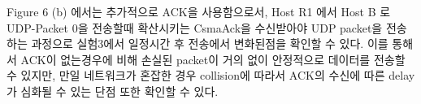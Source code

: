 Figure 6 (b) 에서는 추가적으로 ACK을 사용함으로서, Host R1 에서 Host B 로  UDP-Packet 0을 전송할때 확산시키는 CsmaAck을 수신받아야 UDP packet을 전송하는 과정으로 실험3에서 일정시간 후 전송에서 변화된점을 확인할 수 있다. 이를 통해서 ACK이 없는경우에 비해 손실된 packet이 거의 없이 안정적으로 데이터를 전송할 수 있지만, 만일 네트워크가 혼잡한 경우 collision에 따라서 ACK의 수신에 따른 delay가 심화될 수 있는 단점 또한 확인할 수 있다.\\
\begin{figure}[h!]
\centering
{}\hspace{3mm}
\end{figure}

\clearpage